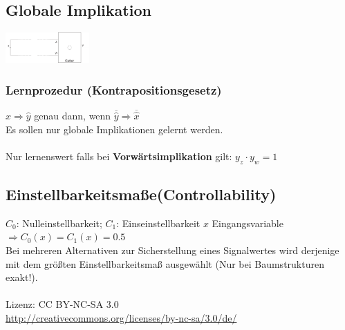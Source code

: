 \documentclass[a4paper,twocolumn,10pt]{article}
\begin{document}
\subsection*{Globale Implikation}
\includegraphics[width=0.24\textwidth]{Grafiken/Lernkriterium}

\subsubsection*{Lernprozedur (Kontrapositionsgesetz)}
$\widehat{x} \Rightarrow \widehat{y}$ genau dann, wenn $\overline{\widehat{y}} \Rightarrow \overline{\widehat{x}}$\\
Es sollen nur globale Implikationen gelernt werden.\\\\
Nur lernenswert falls bei \textbf{Vorwärtsimplikation} gilt:
$y_z\cdot y_w=1$

\subsection*{Einstellbarkeitsmaße(Controllability)}
$C_0$: Nulleinstellbarkeit; $C_1$: Einseinstellbarkeit
$x$ Eingangsvariable $\Rightarrow C_0(x)=C_1(x)=0.5$\\
Bei mehreren Alternativen zur Sicherstellung eines Signalwertes wird derjenige mit dem größten Einstellbarkeitsmaß ausgewählt (Nur bei Baumstrukturen exakt!).
\\\\
Lizenz: CC BY-NC-SA 3.0\\
\url{http://creativecommons.org/licenses/by-nc-sa/3.0/de/}
\end{document}
